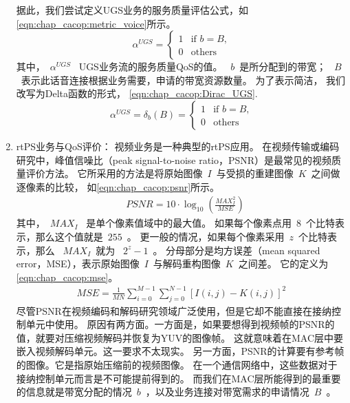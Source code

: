 \begin{enumerate}[(1)]
据此，我们尝试定义UGS业务的服务质量评估公式，如\eqref{eqn:chap_cacop:metric_voice}所示。
\begin{equation}
\label{eqn:chap_cacop:metric_voice}
\alpha^{UGS}=
\begin{cases}
1 & \text{if $b=B$,}\\
0 &\text{others}
\end{cases}
\end{equation}
其中，~$\alpha^{UGS}$~ UGS业务流的服务质量QoS的值。
~$b$~是所分配到的带宽；
~$B$~表示此话音连接根据业务需要，申请的带宽资源数量。
为了表示简洁，
我们改写为Delta函数的形式，
\eqref{eqn:chap_cacop:Dirac_UGS}.
%
\begin{equation}
\label{eqn:chap_cacop:Dirac_UGS}
\alpha^{UGS}= \delta_{b}(B) = 
\begin{cases}
1 & \text{if $b= B$,}\\
0 &\text{others}
\end{cases}
\end{equation}

\item rtPS业务与QoS评价： 
视频业务是一种典型的rtPS应用。
在视频传输或编码研究中，峰值信噪比（peak signal-to-noise ratio，PSNR）是最常见的视频质量评价方法。
它所采用的方法是将原始图像~$I$~与受损的重建图像~$K$~之间做逐像素的比较，
如\eqref{eqn:chap_cacop:psnr}所示。 
%
\begin{align}
\label{eqn:chap_cacop:psnr}
& PSNR = 10 \cdot \log_{10} \left( \frac{MAX_I^2}{MSE} \right)
\end{align}
其中，~$MAX_I$~ 是单个像素值域中的最大值。
如果每个像素点用~$8$~个比特表示，那么这个值就是~$255$~。
更一般的情况，如果每个像素采用~$z$~个比特表示，那么 ~$MAX_I$~就为 ~$2^z - 1$~。
分母部分是均方误差（mean squared error，MSE），表示原始图像~$I$~与解码重构图像~$K$~之间差。
它的定义为\eqref{eqn:chap_cacop:mse}。
\begin{align}
\label{eqn:chap_cacop:mse}
MSE = \frac{1}{MN} \sum_{i=0}^{M-1}\sum_{j=0}^{N-1} \left[I(i,j) - K(i,j)\right]^2 
\end{align}
尽管PSNR在视频编码和解码研究领域广泛使用，但是它却不能直接在接纳控制单元中使用。
原因有两方面。一方面是，如果要想得到视频帧的PSNR的值，就要对压缩视频解码并恢复为YUV的图像帧。
这就意味着在MAC层中要嵌入视频解码单元。这一要求不太现实。
另一方面，PSNR的计算要有参考帧的图像。它是指原始压缩前的视频图像。
在一个通信网络中，这些数据对于接纳控制单元而言是不可能提前得到的。
而我们在MAC层所能得到的最重要的信息就是带宽分配的情况~$b$~，以及业务连接对带宽需求的申请情况~$B$~。


\end{enumerate}
